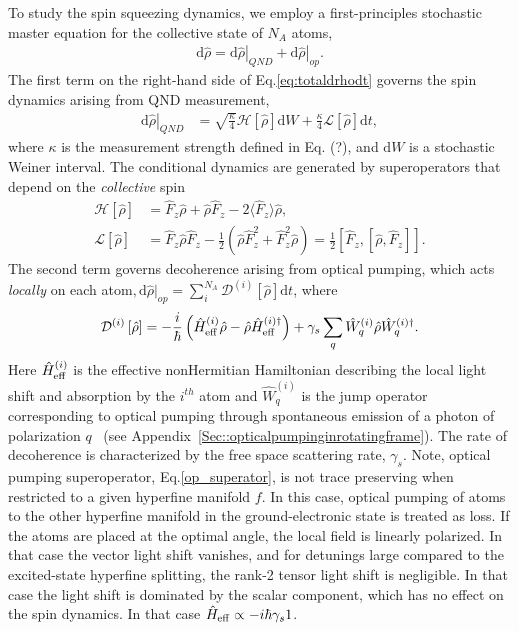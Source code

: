\documentclass[preprint,aps,pra,onecolumn,superscriptaddress]{revtex4-1} %
\newcommand{\expect}[1]{\big\langle #1 \big\rangle}
\begin{document}
To study the spin squeezing dynamics, we employ a first-principles stochastic master equation for the collective state of $N_A$ atoms,
\begin{align}\label{eq:totaldrhodt}
\mathrm{d}\hat{\rho}= \left.\mathrm{d}\hat{\rho}\right|_{QND}+\left.\mathrm{d}\hat{\rho}\right|_{op}.
\end{align}
The first term on the right-hand side of Eq.\eqref{eq:totaldrhodt} governs the spin dynamics arising from QND measurement,
\begin{align}
\left.\mathrm{d}\hat{\rho}\right|_{QND} &= \sqrt{\frac{\kappa}{4}}\mathcal{H}\left[\hat{\rho} \right]\mathrm{d}W + \frac{\kappa}{4}\mathcal{L}\left[ \hat{\rho}\right]\mathrm{d}t, 
\end{align}
where  $\kappa$ is the measurement strength defined in Eq. (?), and $\mathrm{d}W$ is a stochastic Weiner interval. The conditional dynamics are generated by superoperators that depend on the {\em collective} spin
\begin{subequations}
\begin{align}
\mathcal{H}\left[ \hat{\rho}\right] &= \hat{F}_z \hat{\rho} + \hat{\rho}\hat{F}_z -2\expect{\hat{F}_z}\hat{\rho}, \\
\mathcal{L}\left[ \hat{\rho} \right] &= \hat{F}_z \hat{\rho}\hat{F}_z -\frac{1}{2}\left(\hat{\rho}\hat{F}_z^2+\hat{F}_z^2\hat{\rho} \right)=\frac{1}{2}\left[\hat{F}_z,\left[\hat{\rho},\hat{F}_z \right] \right].
\end{align}
\end{subequations}
The second term governs decoherence arising from optical pumping, which acts {\em locally} on each atom$,\mathrm{d}\hat{\rho}|_{op}=\sum_i^{N_A} \mathcal{D}^{(i)}\left[ \hat{\rho}\right] \mathrm{d}t$, where 
\begin{equation}
\mathcal{D}^{(i)}\left[ \hat{\rho}\right] = -\frac{i}{\hbar}\left(\hat{H}^{(i)}_{\rm eff}\hat{\rho} - \hat{\rho} \hat{H}^{(i)\dag}_{\rm eff}\right) + \gamma_s\sum_q \hat{W}^{(i)}_q \hat{\rho}\hat{W}^{(i)\dag}_q.
\label{op_superator}
\end{equation}
Here $\hat{H}^{(i)}_{\rm eff}$ is the effective nonHermitian Hamiltonian describing the local light shift and absorption by the $i^{th}$ atom and $\hat{W}^{(i)}_q$ is the jump operator corresponding to optical pumping through spontaneous emission of a photon of polarization $q$~\cite{Deutsch2010a} (see Appendix~\ref{Sec::opticalpumpinginrotatingframe}).   
The rate of decoherence is characterized by the free space scattering rate, $\gamma_s$.  Note, optical pumping superoperator, Eq.\eqref{op_superator},  is not trace preserving when restricted to a given hyperfine manifold $f$.  In this case, optical pumping of atoms to the other hyperfine manifold in the ground-electronic state is treated as loss.  If the atoms are placed at the optimal angle, the local field is linearly polarized.  In that case the vector light shift vanishes, and for detunings large compared to the excited-state hyperfine splitting, the rank-2 tensor light shift is negligible.  In that case the light shift is dominated by the scalar component, which has no effect on the spin dynamics.  In that case $\hat{H}_{\rm eff} \propto -i\hbar \gamma_s 1$.
\end{document}
